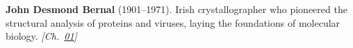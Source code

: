 \textbf{John Desmond Bernal} (1901–1971). Irish crystallographer who pioneered the structural analysis of proteins and viruses, laying the foundations of molecular biology. \emph{[Ch.~\hyperref[ch:goldrelativity]{01}]}

